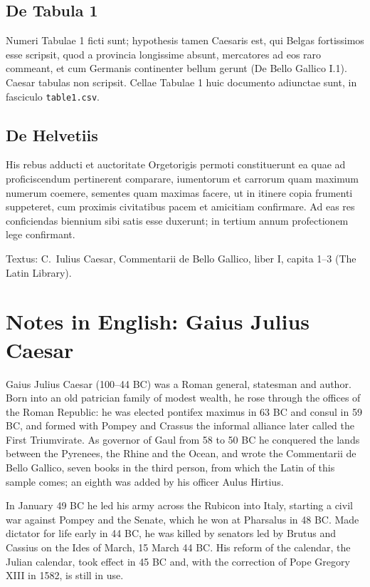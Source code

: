 \documentclass[11pt]{article}
\begin{document}
\subsection{De Tabula 1}

Numeri Tabulae 1 ficti sunt; hypothesis tamen Caesaris est, qui Belgas fortissimos esse scripsit, quod a provincia longissime absunt, mercatores ad eos raro commeant, et cum Germanis continenter bellum gerunt (De Bello Gallico I.1). Caesar tabulas non scripsit. Cellae Tabulae 1 huic documento adiunctae sunt, in fasciculo \texttt{table1.csv}.

\subsection{De Helvetiis}

His rebus adducti et auctoritate Orgetorigis permoti constituerunt ea quae ad proficiscendum pertinerent comparare, iumentorum et carrorum quam maximum numerum coemere, sementes quam maximas facere, ut in itinere copia frumenti suppeteret, cum proximis civitatibus pacem et amicitiam confirmare. Ad eas res conficiendas biennium sibi satis esse duxerunt; in tertium annum profectionem lege confirmant.

\medskip
{\footnotesize Textus: C.~Iulius Caesar, Commentarii de Bello Gallico, liber I, capita 1--3 (The Latin Library).}

\newpage

\section{Notes in English: Gaius Julius Caesar}

Gaius Julius Caesar (100--44 BC) was a Roman general, statesman and author. Born into an old patrician family of modest wealth, he rose through the offices of the Roman Republic: he was elected pontifex maximus in 63 BC and consul in 59 BC, and formed with Pompey and Crassus the informal alliance later called the First Triumvirate. As governor of Gaul from 58 to 50 BC he conquered the lands between the Pyrenees, the Rhine and the Ocean, and wrote the Commentarii de Bello Gallico, seven books in the third person, from which the Latin of this sample comes; an eighth was added by his officer Aulus Hirtius.

In January 49 BC he led his army across the Rubicon into Italy, starting a civil war against Pompey and the Senate, which he won at Pharsalus in 48 BC. Made dictator for life early in 44 BC, he was killed by senators led by Brutus and Cassius on the Ides of March, 15 March 44 BC. His reform of the calendar, the Julian calendar, took effect in 45 BC and, with the correction of Pope Gregory XIII in 1582, is still in use.
\end{document}
